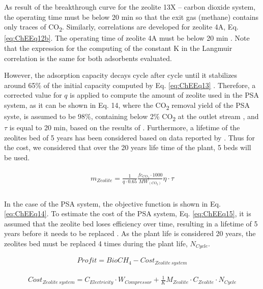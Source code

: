 \begin{refsection}[referencesCh7]
As result of the breakthrough curve for the zeolite 13X – carbon dioxide system, the operating time must be below 20 min so that the exit gas (methane) contains only traces of CO\textsubscript{2}. Similarly, correlations are developed for zeolite 4A, Eq. \ref{eq:ChEEq12b}. The operating time of zeolite 4A must be below 20 min \citep{hauchhum2014carbon}. Note that the expression for the computing of the constant K in the Langmuir correlation is the same for both adsorbents evaluated.

However, the adsorption capacity decays cycle after cycle until it stabilizes around 65\% of the initial capacity computed by Eq. \ref{eq:ChEEq13} \citep{hauchhum2014carbon}. Therefore, a corrected value for $q$ is applied to compute the amount of zeolite used in the PSA system, as it can be shown in Eq. 14, where the CO\textsubscript{2} removal yield of the PSA syste, is assumed to be 98\%, containing below 2\% CO\textsubscript{2} at the outlet stream \citep{ferella2017separation}, and $\tau$ is equal to 20 min, based on the results of \citep{hauchhum2014carbon}. Furthermore, a lifetime of the zeolites bed of 5 years has been considered based on data reported by \citet{Xiao2013}. Thus for the cost, we considered that over the 20 years life time of the plant, 5 beds will be used.

\begin{align}
\begin{array}{l}{m_{Zeolite}} = \frac{1}{{q\cdot0.65}}\frac{{f{c_{C{O_2}}}\cdot1000}}{{M{W_{(C{O_2})}}}}\eta \cdot\tau \\\end{array} \label{eq:ChEEq13}
\end{align}

In the case of the PSA system, the objective function is shown in Eq. \ref{eq:ChEEq14}. To estimate the cost of the PSA system, Eq. \ref{eq:ChEEq15}, it is assumed that the zeolite bed loses efficiency over time, resulting in a lifetime of 5 years before it needs to be replaced \citep{Xiao2013}. As the plant life is considered 20 years, the zeolites bed must be replaced 4 times during the plant life, $N_{Cycle}$. 

\begin{align}
Profit = BioCH_{4} - Cost_{Zeolite \ system} \label{eq:ChEEq14}
\end{align}

\begin{align}
Cost_{Zeolite \ system} = C_{Electricity} \cdot W_{Compressor} + \frac{1}{K}{M_{Zeolite}} \cdot {C_{Zeolite}}\cdot{N_{Cycle}} \label{eq:ChEEq15}
\end{align}


\end{refsection}
